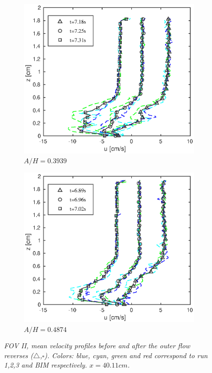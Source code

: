 \documentclass[review]{elsarticle}
\begin{document}
\begin{figure}[]
{\begin{subfigure}[b]{.3\textwidth}
\centering
\includegraphics[width=.95\textwidth]{./Figures/FOV_4/case40_sept2015.eps}
\caption{\textit{$A/H=0.3939$}}
\end{subfigure}%
\begin{subfigure}[b]{.3\textwidth}
\centering
\includegraphics[width=.95\textwidth]{./Figures/FOV_4/case50_sept2015.eps}
\caption{\textit{$A/H=0.4874$}}
\end{subfigure}%
}
\caption{ \textit{FOV II, mean velocity profiles before  and after the outer flow reverses ($\triangle$,$\square$). Colors: blue, cyan, green and red correspond to run 1,2,3 and BIM respectively.  $x=40.11cm$. } }
\label{fig:PIV_FOV4}
\end{figure}
\end{document}
